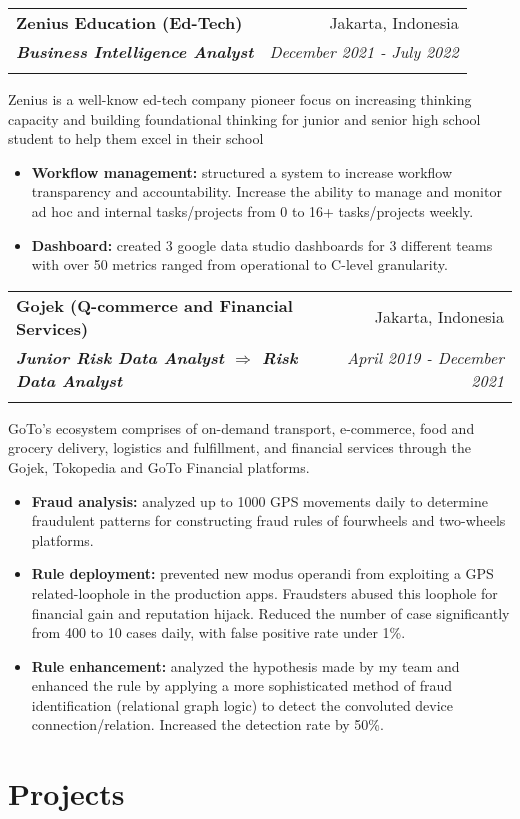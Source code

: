 \documentclass[a4paper, 11pt]{article}
\makeatletter
\newcommand{\resumeItem}[2]{
    \item\small{
        \textbf{#1}{#2 \vspace{-2pt}}
    }
}
\newcommand{\resumeSubheading}[4]{
    \vspace{-1pt}
    \begin{tabular*}{0.97\textwidth}{l@{\extracolsep{\fill}}r}
        \color{lightblue}\textbf{#1} & #2 \\
        \textbf{\textit{\small#3}} & \textit{\small #4} \\
        \textnormal{}\vspace{-5pt}
    \end{tabular*}\vspace{-5pt}
}
\newcommand{\resumeSubHeadingListEnd}{\end{itemize}}
\newcommand{\resumeItemListStart}{\begin{itemize}[leftmargin=*]\setlength\itemsep{0em}\vspace{-1pt}}
\newcommand{\resumeItemListEnd}{\end{itemize}\vspace{-5pt}}
\makeatother
\begin{document}
    \vspace{5pt}
    \resumeSubheading
    {Zenius Education (Ed-Tech)}
    {Jakarta, Indonesia}
    {Business Intelligence Analyst}
    {December 2021 - July 2022}
    {Zenius is a well-know ed-tech company pioneer focus on increasing thinking capacity and building foundational thinking for junior
    and senior high school student to help them excel in their school}
    \vspace{-5pt}
    \resumeItemListStart
    \resumeItem{Workflow management:}{ structured a system to increase workflow transparency and accountability. 
    Increase the ability to manage and monitor ad hoc and internal tasks/projects from 0 to 16+ tasks/projects weekly.}
    \resumeItem{Dashboard:}{ created 3 google data studio dashboards for 3 different teams with 
    over 50 metrics ranged from operational to C-level granularity.}
    \resumeItemListEnd

    \vspace{5pt}
    \resumeSubheading
    {Gojek (Q-commerce and Financial Services)}
    {Jakarta, Indonesia}
    {Junior Risk Data Analyst $\Rightarrow$ Risk Data Analyst}
    {April 2019 - December 2021}
    {GoTo’s ecosystem comprises of on-demand transport, e-commerce, food and grocery delivery, logistics and fulfillment, and financial
    services through the Gojek, Tokopedia and GoTo Financial platforms.}
    \vspace{-5pt}
    \resumeItemListStart
    \resumeItem{Fraud analysis:}{ analyzed up to 1000 GPS movements daily to determine 
    fraudulent patterns for constructing fraud rules of fourwheels and two-wheels platforms.}
    \resumeItem{Rule deployment:}{ prevented new modus operandi from exploiting a GPS related-loophole in the production apps. 
    Fraudsters abused this loophole for financial gain and reputation hijack. Reduced the number of
    case significantly from 400 to 10 cases daily, with false positive rate under 1\%.}
    \resumeItem{Rule enhancement:}{ analyzed the hypothesis made by my team 
    and enhanced the rule by applying a more sophisticated method of fraud identification (relational graph logic) 
    to detect the convoluted device connection/relation. Increased the detection rate by 50\%.}
    \resumeItemListEnd


    \vspace{-5pt}
    \section{Projects}
\end{document}
